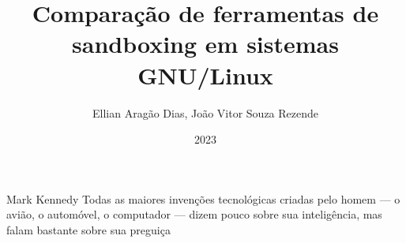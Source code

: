 \documentclass[pt,twoside,onehalfspacing,bsc]{ifbclass/ifbclass}
\title{Comparação de ferramentas de sandboxing em sistemas GNU/Linux}
\date{2023}
\author{Ellian Aragão Dias, João Vitor Souza Rezende}
\begin{document}
  
  \frontmatter
  
  \frontpage
  
  \presentationpage
  
  \begin{fichacatalografica}
    \FakeFichaCatalografica %
  \end{fichacatalografica}
  
  \banca
  
  
  \acknowledgements
  
  \begin{epigraph}{Mark Kennedy}
  Todas as maiores invenções tecnológicas criadas pelo homem — o avião, o automóvel, o computador — dizem pouco sobre sua inteligência, mas falam bastante sobre sua preguiça
  \end{epigraph}
  
  \resumo
  {\parindent0pt
    
  }
  
  \abstract
  {\parindent0pt
    
  }
  
  
  
  
  
  \tableofcontents
  
  \mainmatter
  
  
  
  
  
  {\parindent0pt
    
  }

  {\parindent0pt
    
  }
  
  
  \begin{references}
    
  \end{references}
  
  
  
\end{document}
